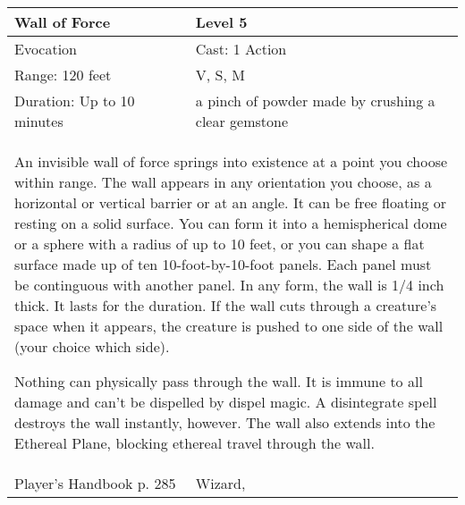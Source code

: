 \documentclass[11pt]{report}
\begin{document}
\begin{table}[H]
	\begin{tabular}{||p{6cm}|p{6cm}||}
		\hline\hline
		\bf{Wall of Force} & Level 5\\ \hline
		Evocation & Cast: 1 Action\\ \hline
		Range: 120 feet & V, S, M\\ \hline
		Duration: Up to 10 minutes & a pinch of powder made by crushing a clear gemstone\\ \hline
		\multicolumn{2}{||p{12cm}||}{An invisible wall of force springs into existence at a point you choose within range.
The wall appears in any orientation you choose, as a horizontal or vertical barrier or at an angle. It can be free floating or resting on a solid surface. You can form it into a hemispherical dome or a sphere with a radius of up to 10 feet, or you can shape a flat surface made up of ten 10-foot-by-10-foot panels. Each panel must be continguous with another panel. In any form, the wall is 1/4 inch thick. It lasts for the duration. If the wall cuts through a creature’s space when it appears, the creature is pushed to one side of the wall (your choice which side).

Nothing can physically pass through the wall. It is immune to all damage and can’t be dispelled by dispel magic. A disintegrate spell destroys the wall instantly, however.  The wall also extends into the Ethereal Plane, blocking ethereal travel through the wall.}\\ \hline
Player's Handbook p. 285 & Wizard, \\ \hline\hline
	\end{tabular}
\end{table}
\end{document}
